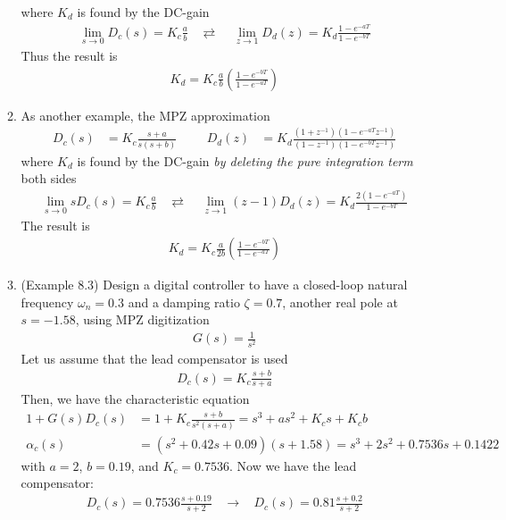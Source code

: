 \documentclass[landscape,14pt]{oblivoir}
\begin{document}
\begin{itemize}
\begin{enumerate}
		where $K_d$ is found by the DC-gain 
		\begin{align*}
			\lim_{s \rightarrow 0} D_c(s) = K_c \frac{a}{b} ~~~~\rightleftarrows~~~~~ 
			\lim_{z \rightarrow 1} D_d(z) = K_d \frac{1-e^{-aT}}{1-e^{-bT}} 
		\end{align*} 
		Thus the result is
		\begin{align*}
			K_d = K_c \frac{a}{b} \left( \frac{1-e^{-bT}}{1-e^{-aT}} \right) 
		\end{align*}
%
\newpage
%
		\item As another example, the MPZ approximation  
		\begin{align*}
			D_c(s) &= K_c \frac{s+a}{s(s+b)} &&& D_d(z) &= K_d \frac{(1+z^{-1})(1-e^{-aT}z^{-1})}{(1-z^{-1})(1-e^{-bT}z^{-1})}
		\end{align*}
		where $K_d$ is found by the DC-gain \emph{by deleting the pure integration term} both sides
		\begin{align*}
			\lim_{s \rightarrow 0} sD_c(s) = K_c \frac{a}{b} ~~~~\rightleftarrows~~~~~ 
			\lim_{z \rightarrow 1} (z-1)D_d(z) = K_d \frac{2(1-e^{-aT})}{1-e^{-bT}} 
		\end{align*} 
		The result is
		\begin{align*}
			K_d = K_c \frac{a}{2b} \left( \frac{1-e^{-bT}}{1-e^{-aT}} \right) 
		\end{align*}
%
\newpage
%
		\item (Example 8.3) Design a digital controller to have a closed-loop natural frequency $\omega_n = 0.3$ and a damping ratio $\zeta = 0.7$, another real pole at $s=-1.58$, using MPZ digitization
		\begin{align*}
			G(s) = \frac{1}{s^2}
		\end{align*}
		Let us assume that the lead compensator is used
		\begin{align*}
			D_c(s) = K_c \frac{s+b}{s+a} 
		\end{align*}
		Then, we have the characteristic equation
		\begin{align*}
			1+G(s) D_c(s) &= 1 + K_c \frac{s+b}{s^2(s+a)}  = s^3 + as^2 + K_c s + K_c b \\
			\alpha_c(s) &= (s^2 + 0.42s + 0.09)(s+1.58) = s^3 + 2s^2 + 0.7536s + 0.1422
		\end{align*}
	    with $a=2$, $b=0.19$, and $K_c = 0.7536$. Now we have the lead compensator: 
		\begin{align*}
			D_c(s) = 0.7536 \frac{s+0.19}{s+2} ~~~~\rightarrow~~~~
			D_c(s) = 0.81 \frac{s+0.2}{s+2}
		\end{align*}

\end{enumerate}
\end{itemize}
\end{document}

